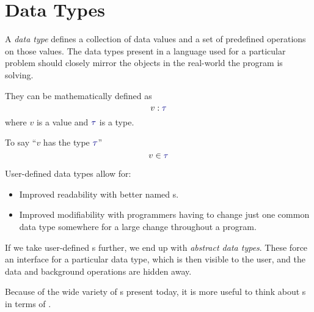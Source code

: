 \section{Data Types}\label{sec:Data_Types}
\begin{definition}\label{def:Data_Type}
  A \emph{data type} defines a collection of data values and a set of predefined operations on those values.
  The data types present in a language used for a particular problem should closely mirror the objects in the real-world the program is solving.

  They can be mathematically defined as
  \begin{equation}\label{eq:Data_Type}
    v : \DataType
  \end{equation}
  where $v$ is a value and $\DataType$ is a type.

  \begin{remark}\label{rmk:Has_the_Type}
    To say ``$v$ has the type $\DataType$''
    \begin{equation}\label{eq:Has_the_Type}
      v \in \DataType
    \end{equation}
  \end{remark}
\end{definition}

User-defined data types allow for:
\begin{itemize}[noitemsep]
\item Improved readability with better named s.
\item Improved modifiability with programmers having to change just one common data type somewhere for a large change throughout a program.
\end{itemize}

If we take user-defined s further, we end up with \emph{abstract data types}.
These force an interface for a particular data type, which is then visible to the user, and the data and background operations are hidden away.

Because of the wide variety of s present today, it is more useful to think about s in terms of .

